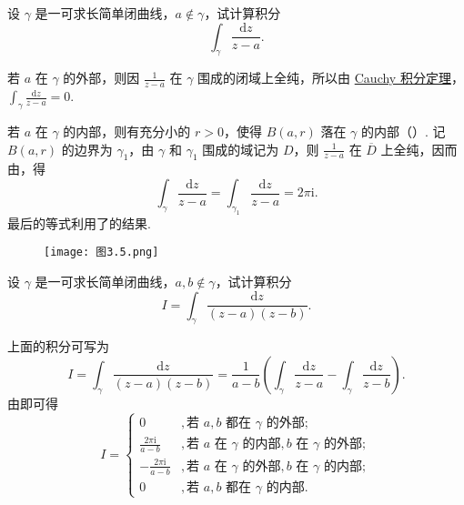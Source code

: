 \documentclass[../../main.tex]{subfiles}
\begin{document}
\begin{example}\label{example:例3.2.7}
设 \( \gamma \) 是一可求长简单闭曲线，\( a \notin \gamma \)，试计算积分
\[
\int_\gamma \frac{\mathrm{d}z}{z - a}.
\]
\end{example}
\begin{solution}
若 \( a \) 在 \( \gamma \) 的外部，则因 \( \frac{1}{z - a} \) 在 \( \gamma \) 围成的闭域上全纯，所以由 \hyperref[theorem:Cauchy-Goursat定理(Cauchy积分定理)]{Cauchy 积分定理}，\( \int_\gamma \frac{\mathrm{d}z}{z - a} = 0 \).

若 \( a \) 在 \( \gamma \) 的内部，则有充分小的 \( r > 0 \)，使得 \( B(a, r) \) 落在 \( \gamma \) 的内部（）. 记 \( B(a, r) \) 的边界为 \( \gamma_1 \)，由 \( \gamma \) 和 \( \gamma_1 \) 围成的域记为 \( D \)，则 \( \frac{1}{z - a} \) 在 \( \overline{D} \) 上全纯，因而由，得
\[
\int_\gamma \frac{\mathrm{d}z}{z - a} = \int_{\gamma_1} \frac{\mathrm{d}z}{z - a} = 2\pi \mathrm{i}.
\]
最后的等式利用了的结果.

\begin{figure}[H]
\centering
\texttt{[image: 图3.5.png]}
\caption{}
\label{figure:图3.5}
\end{figure}
\end{solution}

\begin{example}
设 \( \gamma \) 是一可求长简单闭曲线，\( a, b \notin \gamma \)，试计算积分
\[
I = \int_\gamma \frac{\mathrm{d}z}{(z - a)(z - b)}.
\]
\end{example}
\begin{solution}
上面的积分可写为
\[
I = \int_\gamma \frac{\mathrm{d}z}{(z - a)(z - b)}
= \frac{1}{a - b} \left( \int_\gamma \frac{\mathrm{d}z}{z - a} - \int_\gamma \frac{\mathrm{d}z}{z - b} \right).
\]
由即可得
\[
I = 
\begin{cases} 
0&,  \text{若 } a, b \text{ 都在 } \gamma \text{ 的外部}; \\
\frac{2\pi \mathrm{i}}{a - b}&,  \text{若 } a \text{ 在 } \gamma \text{ 的内部}, b \text{ 在 } \gamma \text{ 的外部}; \\
-\frac{2\pi \mathrm{i}}{a - b}&,  \text{若 } a \text{ 在 } \gamma \text{ 的外部}, b \text{ 在 } \gamma \text{ 的内部}; \\
0&,  \text{若 } a, b \text{ 都在 } \gamma \text{ 的内部}.
\end{cases}
\]
\end{solution}
\end{document}

